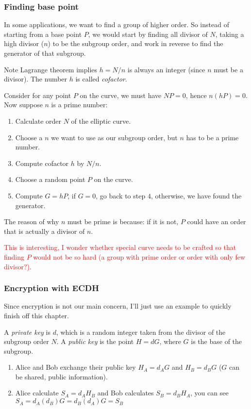 \documentclass[10pt]{article}
\newcommand{\HL}[1]{\textcolor{red}{#1}}
\begin{document}
\subsubsection{Finding base point}
In some applications, we want to find a group of higher order. So instead of
starting from a base point $P$, we would start by finding all divisor of $N$, taking a
high divisor ($n$) to be the subgroup order, and work in reverse to find the generator
of that subgroup.

Note Lagrange theorem implies $h = N/n$ is always an integer (since $n$ must be
a divisor). The number $h$ is called \emph{cofactor}.

Consider for any point $P$ on the curve, we must have $NP = 0$, hence $n(hP) =
0$.
Now suppose $n$ is a prime number:
\begin{enumerate}
    \item Calculate order $N$ of the elliptic curve.
    \item Choose a $n$ we want to use as our subgroup order, but $n$ has to be a prime number.
    \item Compute cofactor $h$ by $N / n$.
    \item Choose a random point $P$ on the curve.
    \item Compute $G = hP$, if $G = 0$, go back to step $4$, otherwise, we
        have found the generator.
\end{enumerate}
The reason of why $n$ must be prime is because: if it is not, $P$ could have an
order that is actually a divisor of $n$.

\HL{This is interesting, I wonder whether special curve needs to be crafted so
that finding $P$ would not be so hard (a group with prime order or order with
only few divisor?).}

\subsubsection{Encryption with ECDH}
Since encryption is not our main concern, I'll just use an example to quickly
finish off this chapter.

A \emph{private key} is $d$, which is a random integer taken from the divisor of the
subgroup order $N$.
A \emph{public key} is the point $H=dG$, where $G$ is the base of the subgroup.

\begin{enumerate}
    \item Alice and Bob exchange their public key $H_A = d_AG$ and $H_B = d_BG$
        ($G$ can be shared, public information).
    \item Alice calculate $S_A = d_AH_B$ and Bob calculates $S_B = d_BH_A$, you
        can see $S_A = d_A(d_B)G = d_B(d_A)G = S_B$
\end{enumerate}
\end{document}
